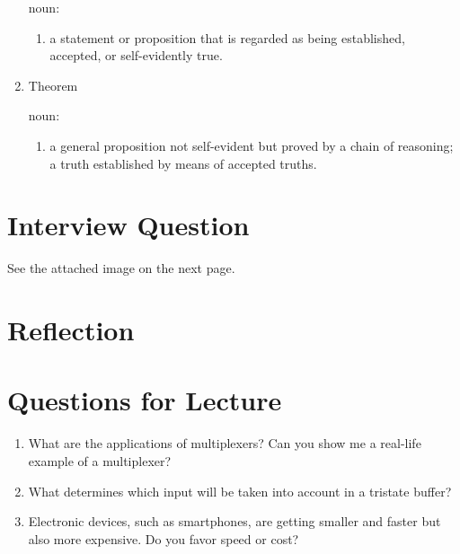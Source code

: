 \documentclass[12pt]{article}
\begin{document}
\begin{enumerate}
    noun:

    \begin{enumerate}
        \item a statement or proposition that is regarded as being established, accepted, or self-evidently true.
    \end{enumerate}

    \item{Theorem}

    noun:

    \begin{enumerate}
        \item a general proposition not self-evident but proved by a chain of reasoning; a truth established by means of accepted truths.
    \end{enumerate}
\end{enumerate}

\section{Interview Question}

See the attached image on the next page.

% 

\section{Reflection}

\section{Questions for Lecture}

\begin{enumerate}
    \item What are the applications of multiplexers? Can you show me a real-life example of a multiplexer?
    \item What determines which input will be taken into account in a tristate buffer?
    \item Electronic devices, such as smartphones, are getting smaller and faster but also more expensive. Do you favor speed or cost?
\end{enumerate}



\end{document}
